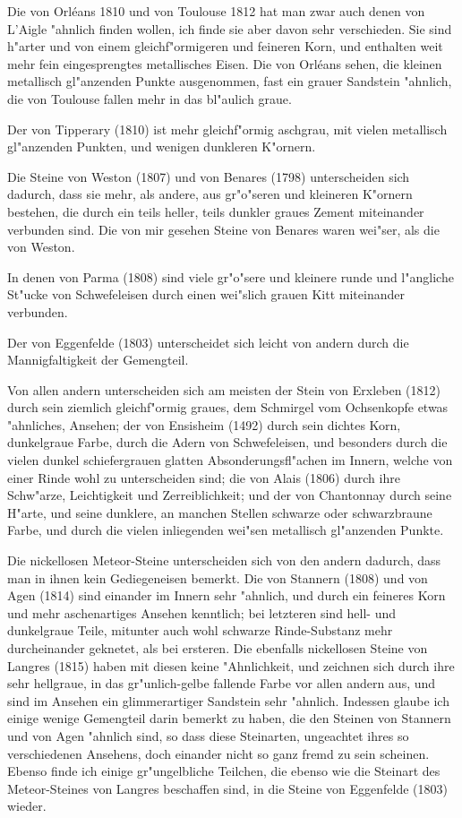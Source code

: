 \documentclass[a4paper, 11pt, oneside, polutonikogreek, german]{article}
\begin{document}
Die von Orléans 1810 und von Toulouse 1812 hat man zwar auch denen von L'Aigle "ahnlich finden wollen, ich finde sie aber davon sehr verschieden. Sie sind h"arter und von einem gleichf"ormigeren und feineren Korn, und enthalten weit mehr fein eingesprengtes metallisches Eisen. Die von Orléans sehen, die kleinen metallisch gl"anzenden Punkte ausgenommen, fast ein grauer Sandstein "ahnlich, die von Toulouse fallen mehr in das bl"aulich graue.

Der von Tipperary (1810) ist mehr gleichf"ormig aschgrau, mit vielen metallisch gl"anzenden Punkten, und wenigen dunkleren K"ornern.

Die Steine von Weston (1807) und von Benares (1798) unterscheiden sich dadurch, dass sie mehr, als andere, aus gr"o"seren und kleineren K"ornern bestehen, die durch ein teils heller, teils dunkler graues Zement miteinander verbunden sind. Die von mir gesehen Steine von Benares waren wei"ser, als die von Weston.

In denen von Parma (1808) sind viele gr"o"sere und kleinere runde und l"angliche St"ucke von Schwefeleisen durch einen wei"slich grauen Kitt miteinander verbunden.

Der von Eggenfelde (1803) unterscheidet sich leicht von andern durch die Mannigfaltigkeit der Gemengteil.

Von allen andern unterscheiden sich am meisten der Stein von Erxleben (1812) durch sein ziemlich gleichf"ormig graues, dem Schmirgel vom Ochsenkopfe etwas "ahnliches, Ansehen; der von Ensisheim (1492) durch sein dichtes Korn, dunkelgraue Farbe, durch die Adern von Schwefeleisen, und besonders durch die vielen dunkel schiefergrauen glatten Absonderungsfl"achen im Innern, welche von einer Rinde wohl zu unterscheiden sind; die von Alais (1806) durch ihre Schw"arze, Leichtigkeit und Zerreiblichkeit; und der von Chantonnay durch seine H"arte, und seine dunklere, an manchen Stellen schwarze oder schwarzbraune Farbe, und durch die vielen inliegenden wei"sen metallisch gl"anzenden Punkte.

Die nickellosen Meteor-Steine unterscheiden sich von den andern dadurch, dass man in ihnen kein Gediegeneisen bemerkt. Die von Stannern (1808) und von Agen (1814) sind einander im Innern sehr "ahnlich, und durch ein feineres Korn und mehr aschenartiges Ansehen kenntlich; bei letzteren sind hell- und dunkelgraue Teile, mitunter auch wohl schwarze Rinde-Substanz mehr durcheinander geknetet, als bei ersteren. Die ebenfalls nickellosen Steine von Langres (1815) haben mit diesen keine "Ahnlichkeit, und zeichnen sich durch ihre sehr hellgraue, in das gr"unlich-gelbe fallende Farbe vor allen andern aus, und sind im Ansehen ein glimmerartiger Sandstein sehr "ahnlich. Indessen glaube ich einige wenige Gemengteil darin bemerkt zu haben, die den Steinen von Stannern und von Agen "ahnlich sind, so dass diese Steinarten, ungeachtet ihres so verschiedenen Ansehens, doch einander nicht so ganz fremd zu sein scheinen. Ebenso finde ich einige gr"ungelbliche Teilchen, die ebenso wie die Steinart des Meteor-Steines von Langres beschaffen sind, in die Steine von Eggenfelde (1803) wieder.
\end{document}

